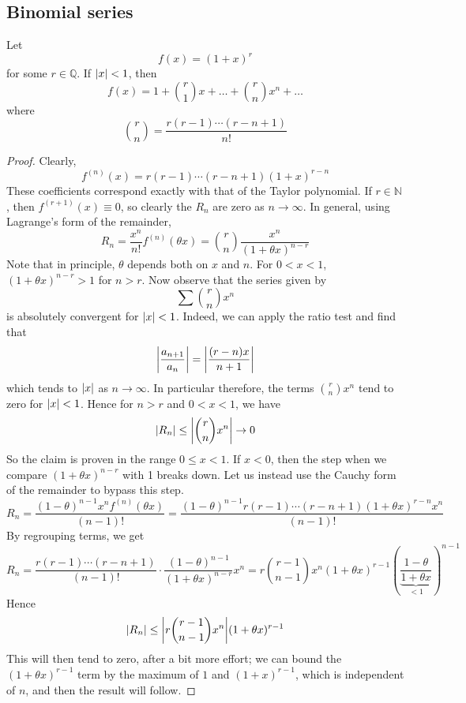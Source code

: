 \subsection{Binomial series}
\begin{proposition}
	Let
	\[
		f(x) = (1 + x)^r
	\]
	for some \(r \in \mathbb Q\).
	If \(\abs{x} < 1\), then
	\[
		f(x) = 1 + \binom{r}{1}x + \dots + \binom{r}{n}x^n + \dots
	\]
	where
	\[
		\binom{r}{n} = \frac{r(r-1)\cdots(r-n+1)}{n!}
	\]
\end{proposition}
\begin{proof}
	Clearly,
	\[
		f^{(n)}(x) = r(r-1)\cdots(r-n+1)(1+x)^{r-n}
	\]
	These coefficients correspond exactly with that of the Taylor polynomial.
	If \(r \in \mathbb N\), then \(f^{(r+1)}(x) \equiv 0\), so clearly the \(R_n\) are zero as \(n \to \infty\).
	In general, using Lagrange's form of the remainder,
	\[
		R_n = \frac{x^n}{n!} f^{(n)}(\theta x) = \binom{r}{n} \frac{x^n}{(1 + \theta x)^{n-r}}
	\]
	Note that in principle, \(\theta\) depends both on \(x\) and \(n\).
	For \(0 < x < 1\), \((1 + \theta x)^{n - r} > 1\) for \(n > r\).
	Now observe that the series given by
	\[
		\sum \binom{r}{n} x^n
	\]
	is absolutely convergent for \(\abs{x} < 1\).
	Indeed, we can apply the ratio test and find that
	\[
		\abs{\frac{a_{n+1}}{a_n}} = \abs{\frac{(r-n)x}{n+1}}
	\]
	which tends to \(\abs{x}\) as \(n \to \infty\).
	In particular therefore, the terms \(\binom{r}{n}x^n\) tend to zero for \(\abs{x} < 1\).
	Hence for \(n > r\) and \(0 < x < 1\), we have
	\[
		\abs{R_n} \leq \abs{\binom{r}{n}x^n} \to 0
	\]
	So the claim is proven in the range \(0 \leq x < 1\).
	If \(x < 0\), then the step when we compare \((1 + \theta x)^{n-r}\) with 1 breaks down.
	Let us instead use the Cauchy form of the remainder to bypass this step.
	\[
		R_n = \frac{(1 - \theta)^{n-1}x^n f^{(n)}(\theta x)}{(n-1)!} = \frac{(1-\theta)^{n-1} r(r-1)\cdots(r-n+1)(1+\theta x)^{r-n} x^n}{(n-1)!}
	\]
	By regrouping terms, we get
	\[
		R_n = \frac{r(r-1)\cdots(r-n+1)}{(n-1)!} \cdot \frac{(1-\theta)^{n-1}}{(1 + \theta x)^{n-r}} x^n = r\binom{r-1}{n-1}x^n (1+\theta x)^{r-1} \left( \underbrace{\frac{1-\theta}{1 + \theta x}}_{<1} \right)^{n-1}
	\]
	Hence
	\[
		\abs{R_n} \leq \abs{r \binom{r-1}{n-1}x^n} (1+\theta x)^{r-1}
	\]
	This will then tend to zero, after a bit more effort; we can bound the \((1 + \theta x)^{r-1}\) term by the maximum of \(1\) and \((1 + x)^{r-1}\), which is independent of \(n\), and then the result will follow.
\end{proof}

